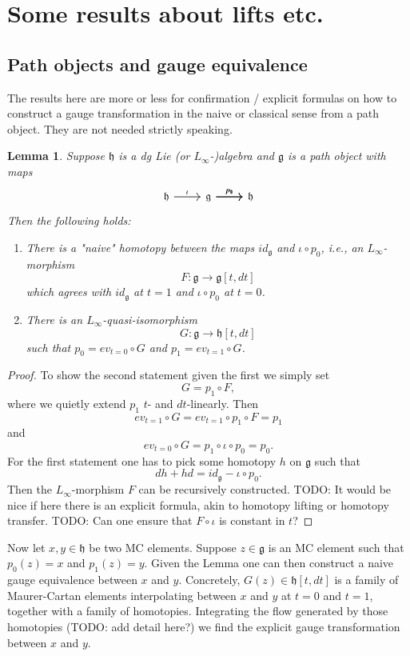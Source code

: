 \documentclass[a4paper]{amsart}
\theoremstyle{plain}
\newtheorem{lemma}[thm]{Lemma}
\theoremstyle{definition}
\newcommand{\alg}[1]{\mathfrak{{#1}}}
\begin{document}
\section{Some results about lifts etc.}
\subsection{Path objects and gauge equivalence}\label{app:pathobjects}
The results here are more or less for confirmation / explicit formulas on how to construct a gauge transformation in the naive or classical sense from a path object. They are not needed strictly speaking.
\begin{lemma}
Suppose $\alg h$ is a dg Lie (or $L_\infty$-)algebra and $\alg g$ is a path object with maps 
\[
\begin{tikzcd}
\alg h \ar{r}{\iota} & \alg g \ar{r}{p_0} \ar{r}{p_1} & \alg h
\end{tikzcd}
\]
Then the following holds:
\begin{enumerate}
\item There is a "naive" homotopy between the maps $\mathit{id}_{\alg g}$ and $\iota\circ p_0$, i.e., an $L_\infty$-morphism
\[
F: \alg g\to \alg g[t,dt]
\]
which agrees with $\mathit{id}_{\alg g}$ at $t=1$ and $\iota\circ p_0$ at $t=0$.
\item There is an $L_\infty$-quasi-isomorphism
\[
G: \alg g\to \alg h[t,dt]
\]
such that $p_0=ev_{t=0}\circ G$ and $p_1=ev_{t=1}\circ G$.
\end{enumerate}
\end{lemma}
\begin{proof}
To show the second statement given the first we simply set 
\[
G = p_1\circ F,
\]
where we quietly extend $p_1$ $t$- and $dt$-linearly. 
Then 
\[
ev_{t=1}\circ G=ev_{t=1}\circ p_1 \circ F = p_1 
\]
and 
\[
ev_{t=0}\circ G=p_1 \circ \iota \circ p_0 = p_0. 
\]
For the first statement one has to pick some homotopy $h$ on $\alg g$ such that
\[
dh+hd = \mathit{id}_{\alg g} - \iota\circ p_0.
\]
Then the $L_\infty$-morphism $F$ can be recursively constructed.
TODO: It would be nice if here there is an explicit formula, akin to homotopy lifting or homotopy transfer.
TODO: Can one ensure that $F\circ \iota$ is constant in $t$?
\end{proof}

Now let $x,y\in \alg h$ be two MC elements. Suppose $z\in \alg g$ is an MC element such that $p_0(z)=x$ and $p_1(z)=y$.  
Given the Lemma one can then construct a naive gauge equivalence between $x$ and $y$.
Concretely, $G(z)\in \alg h[t,dt]$ is a family of Maurer-Cartan elements interpolating between $x$ and $y$ at $t=0$ and $t=1$, together with a family of homotopies. Integrating the flow generated by those homotopies (TODO: add detail here?) we find the explicit gauge transformation between $x$ and $y$.
\end{document}
